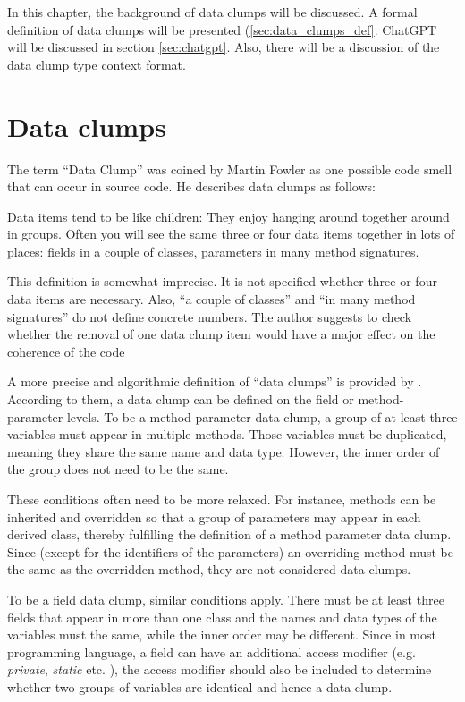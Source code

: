 In this chapter, the background of data clumps will be discussed. A formal definition of data clumps will be presented (\ref{sec:data_clumps_def}. ChatGPT will be discussed in section \ref{sec:chatgpt}. Also, there will be a discussion of the data clump type context format. 

\section{Data clumps}\label{sec:data_clump_def}
The term \enquote{Data Clump} was coined by Martin Fowler as one possible code smell that can occur in source code. He describes data clumps as follows:

\begin{displayquote}
Data items tend to be like children: They enjoy hanging around together around in groups. Often you will see
the same three or four data items together in lots of
places: fields in a couple of classes, parameters in many
method signatures. \cite{fowler2019refactoring} 
\end{displayquote}

This definition is somewhat imprecise. It is not specified whether three or four data items are necessary. Also, \enquote{a couple of classes} and \enquote{in many method signatures} do not define concrete numbers. The author suggests to check whether the removal of one data clump item would have a major effect on the coherence of the code

A more precise and algorithmic definition of \enquote{data clumps} is provided by \cite{zhangImprovingPrecisionFowler2008}. According to them, a data clump  can be defined on the field or method-parameter levels. 
To be a method parameter data clump, a group of at least three variables must appear in multiple methods. Those variables must be duplicated, meaning they share the same name and data type. However, the inner order of the group does not need to be the same. 

These conditions often need to be more relaxed. For instance, methods can be inherited and overridden so that a group of parameters may appear in each derived class, thereby fulfilling the definition of a method parameter data clump. Since (except for the identifiers of the parameters) an overriding method must be the same as the overridden method, they are not considered data clumps.

To be a field data clump, similar conditions apply. There must be at least three fields that appear in more than one class and the names and data types of the variables must the same, while the inner order may be different. Since in most programming language, a field can have an additional access modifier (e.g. \textit{private}, \textit{static} etc. ), the access modifier should also be included to determine whether two groups of variables are identical and hence a data clump.  

